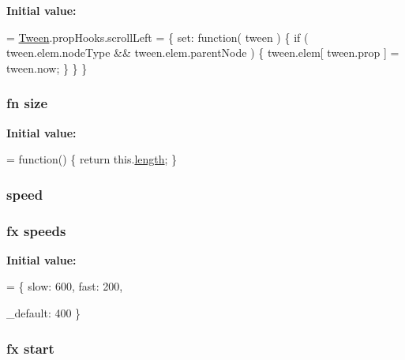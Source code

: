 {\bfseries Initial value\-:}
\begin{DoxyCode}
= \hyperlink{jquery-1_810_82_8js_a91e55267cc469e865a6a7c6cfc51c7b1}{Tween}.propHooks.scrollLeft = \{
    set: \textcolor{keyword}{function}( tween ) \{
        \textcolor{keywordflow}{if} ( tween.elem.nodeType && tween.elem.parentNode ) \{
            tween.elem[ tween.prop ] = tween.now;
        \}
    \}
\}
\end{DoxyCode}
\hypertarget{jquery-1_810_82_8js_afa6806c6ee5e63d5177f1dcc082ba6bc}{
\subsubsection[{size}]{ {\bf fn} size}}\label{jquery-1_810_82_8js_afa6806c6ee5e63d5177f1dcc082ba6bc}
{\bfseries Initial value\-:}
\begin{DoxyCode}
= \textcolor{keyword}{function}() \{
    \textcolor{keywordflow}{return} this.\hyperlink{jquery-1_810_82-vsdoc_8js_aa7de35d58da66d9944ab9cbe82c19640}{length};
\}
\end{DoxyCode}
\hypertarget{jquery-1_810_82_8js_add98c90065e6563cba26ff6d2016c46c}{
\subsubsection[{speed}]{ speed}}\label{jquery-1_810_82_8js_add98c90065e6563cba26ff6d2016c46c}
\hypertarget{jquery-1_810_82_8js_a1079544ab08b6d4ca1692ce090f6ea2d}{
\subsubsection[{speeds}]{ {\bf fx} speeds}}\label{jquery-1_810_82_8js_a1079544ab08b6d4ca1692ce090f6ea2d}
{\bfseries Initial value\-:}
\begin{DoxyCode}
= \{
    slow: 600,
    fast: 200,
    
    \_default: 400
\}
\end{DoxyCode}
\hypertarget{jquery-1_810_82_8js_aef10902ffededd983608fdb8dbfc441a}{
\subsubsection[{start}]{ {\bf fx} start}}\label{jquery-1_810_82_8js_aef10902ffededd983608fdb8dbfc441a}
